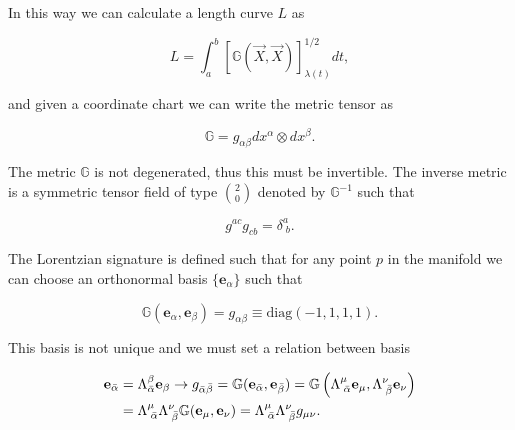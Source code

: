         In this way we can calculate a length curve $L$ as

        \begin{equation}
            L = \int_a^b \left[\mathbb{G}(\Vec{X},\Vec{X})\right]^{1/2}_{\lambda(t)}dt,
        \end{equation}

        and given a coordinate chart we can write the metric tensor as

        \begin{equation}
            \mathbb{G} = g_{\alpha\beta}dx^{\alpha}\otimes dx^{\beta}.
        \end{equation}

        \begin{myDef}
            The metric $\mathbb{G}$ is not degenerated, thus this must be invertible. The inverse metric is a symmetric tensor field of type $\binom{2}{0}$ denoted by $\mathbb{G}^{-1}$ such that

            \begin{equation}
                g^{ac}g_{cb} = \delta^a_{\;b}.
            \end{equation}
        \end{myDef}

        \begin{myDef}
            The Lorentzian signature is defined such that for any point $p$ in the manifold we can choose an orthonormal basis $\{\mathbf{e}_{\alpha}\}$ such that

            \begin{equation}
                \mathbb{G}(\mathbf{e}_{\alpha},\mathbf{e}_{\beta}) = g_{\alpha\beta} \equiv \mathrm{diag}(-1,1,1,1).
            \end{equation}
        \end{myDef}

        This basis is not unique and we must set a relation between basis

        \begin{align*}
            \mathbf{e}_{\Bar{\alpha}} &= \Lambda^{\beta}_{\Bar{\alpha}}\mathbf{e}_{\beta}\rightarrow g_{\Bar{\alpha}\Bar{\beta}} = \mathbb{G}(\mathbf{e}_{\Bar{\alpha}},\mathbf{e}_{\Bar{\beta}}) = \mathbb{G}\left(\Lambda^{\mu}_{\;\Bar{\alpha}}\mathbf{e}_{\mu}, \Lambda^{\nu}_{\;\Bar{\beta}}\mathbf{e}_{\nu}\right)\\
            &= \Lambda^{\mu}_{\;\Bar{\alpha}}\Lambda^{\nu}_{\;\Bar{\beta}}\mathbb{G}(\mathbf{e}_{\mu},\mathbf{e}_{\nu}) = \Lambda^{\mu}_{\;\Bar{\alpha}}\Lambda^{\nu}_{\;\Bar{\beta}} g_{\mu\nu}.
        \end{align*}

